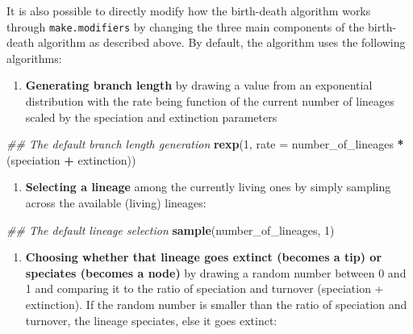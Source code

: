 \documentclass[
]{article}
\newenvironment{Shaded}{\begin{snugshade}}{\end{snugshade}}
\newcommand{\CommentTok}[1]{\textcolor[rgb]{0.56,0.35,0.01}{\textit{#1}}}
\newcommand{\DataTypeTok}[1]{\textcolor[rgb]{0.13,0.29,0.53}{#1}}
\newcommand{\DecValTok}[1]{\textcolor[rgb]{0.00,0.00,0.81}{#1}}
\newcommand{\KeywordTok}[1]{\textcolor[rgb]{0.13,0.29,0.53}{\textbf{#1}}}
\newcommand{\NormalTok}[1]{#1}
\newcommand{\OperatorTok}[1]{\textcolor[rgb]{0.81,0.36,0.00}{\textbf{#1}}}
\newcommand{\StringTok}[1]{\textcolor[rgb]{0.31,0.60,0.02}{#1}}
\providecommand{\tightlist}{%
  \setlength{\itemsep}{0pt}\setlength{\parskip}{0pt}}
\begin{document}
It is also possible to directly modify how the birth-death algorithm
works through \texttt{make.modifiers} by changing the three main
components of the birth-death algorithm as described above. By default,
the algorithm uses the following algorithms:

\begin{enumerate}
\def\labelenumi{\arabic{enumi}.}
\tightlist
\item
  \textbf{Generating branch length} by drawing a value from an
  exponential distribution with the rate being function of the current
  number of lineages scaled by the speciation and extinction parameters
\end{enumerate}

\begin{Shaded}
\begin{Highlighting}[]
\CommentTok{\#\# The default branch length generation}
\KeywordTok{rexp}\NormalTok{(}\DecValTok{1}\NormalTok{, }\DataTypeTok{rate =}\NormalTok{ number\_of\_lineages }\OperatorTok{*}\StringTok{ }\NormalTok{(speciation }\OperatorTok{+}\StringTok{ }\NormalTok{extinction))}
\end{Highlighting}
\end{Shaded}

\begin{enumerate}
\def\labelenumi{\arabic{enumi}.}
\setcounter{enumi}{1}
\tightlist
\item
  \textbf{Selecting a lineage} among the currently living ones by simply
  sampling across the available (living) lineages:
\end{enumerate}

\begin{Shaded}
\begin{Highlighting}[]
\CommentTok{\#\# The default lineage selection}
\KeywordTok{sample}\NormalTok{(number\_of\_lineages, }\DecValTok{1}\NormalTok{)}
\end{Highlighting}
\end{Shaded}

\begin{enumerate}
\def\labelenumi{\arabic{enumi}.}
\setcounter{enumi}{2}
\tightlist
\item
  \textbf{Choosing whether that lineage goes extinct (becomes a tip) or
  speciates (becomes a node)} by drawing a random number between 0 and 1
  and comparing it to the ratio of speciation and turnover (speciation +
  extinction). If the random number is smaller than the ratio of
  speciation and turnover, the lineage speciates, else it goes extinct:
\end{enumerate}
\end{document}
